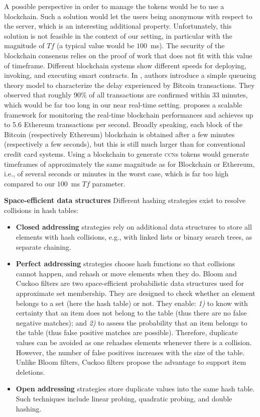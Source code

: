 \documentclass{llncs}
\newcounter{prob}
\newcommand{\cn}[1]{\emph{\bf \color{purple}~[Cyrius: #1]}}
\begin{document}
A possible perspective in order to manage the tokens would be to use a blockchain.
Such a solution would let the users being anonymous with respect to the server, which is an interesting additional property.
Unfortunately, this solution is not feasible in the context of our setting, in particular with the magnitude of $Tf$ (a typical value would be $100$~ms). The security of the blockchain consensus relies on the proof of work that does not fit with this value of timeframe. Different blockchain systems show different speeds for deploying, invoking, and executing smart contracts. In \cite{Ricci2019}, authors introduce a simple queueing theory model to characterize the delay experienced by Bitcoin transactions. They observed that roughly 90\% of all transactions are confirmed within 33 minutes, which would be far too long in our near real-time setting. \cite{Zheng2018} proposes a scalable framework for monitoring the real-time blockchain performances and achieves up to 5.6 Ethereum transactions per second. Broadly speaking, each block of the Bitcoin (respectively Ethereum) blockchain is obtained after a few minutes (respectively a few seconds), but this is still much larger than for conventional credit card systems. Using a blockchain to generate \textsc{ccn}s tokens would generate timeframes of approximately the same magnitude as for Blockchain or Ethereum, i.e., of several seconds or minutes in the worst case, which is far too high compared to our $100$~ms $Tf$ parameter.

\textbf{Space-efficient data structures}
Different hashing strategies exist to resolve collisions in hash tables:
\begin{itemize}
    \item \textbf{Closed addressing} strategies rely on additional data structures to store all elements with hash collisions, e.g., with linked lists or binary search trees, as separate chaining.
    \item \textbf{Perfect addressing} strategies choose hash functions so that collisions cannot happen, and rehash or move elements when they do. Bloom and Cuckoo filters \cite{Bloom1970} are two space-efficient probabilistic data structures used for approximate set membership. They are designed to check whether an element belongs to a set (here the hash table) or not. They enable: \textit{1)} to know with certainty that an item does not belong to the table (thus there are no false negative matches); and \textit{2)} to assess the probability that an item belongs to the table (thus false positive matches are possible). Therefore, duplicate values can be avoided as one rehashes elements whenever there is a collision. However, the number of false positives increases with the size of the table. Unlike Bloom filters, Cuckoo filters propose the advantage to support item deletions.
    \item \textbf{Open addressing} strategies store duplicate values into the same hash table. Such techniques include linear probing, quadratic probing, and double hashing.
\end{itemize}
\end{document}

